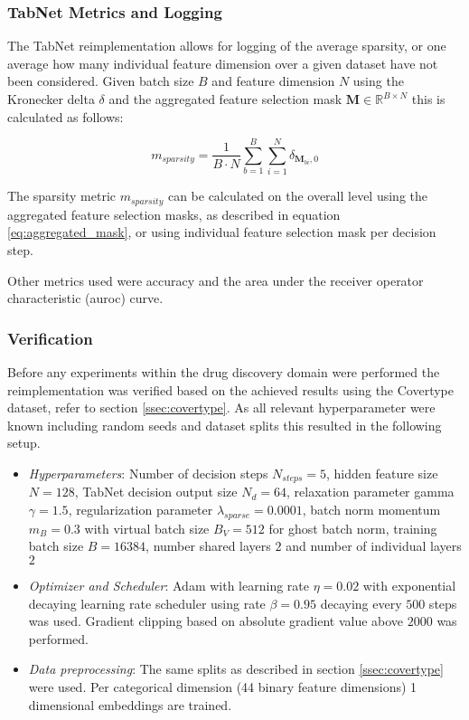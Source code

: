 \documentclass[../main.tex]{subfiles}
\begin{document}
\subsubsection{TabNet Metrics and Logging}

The TabNet reimplementation allows for logging of the average sparsity, or one average how many individual feature dimension over a given dataset have not been considered. Given batch size $B$ and feature dimension $N$ using the Kronecker delta $\delta$ and the aggregated feature selection mask $\mathbf{M} \in \mathbb{R}^{B \times N}$ this is calculated as follows:

\begin{equation} \label{eq:sparsity}
	m_{sparsity}=\frac{1}{B \cdot N}\sum_{b=1}^{B} \sum_{i=1}^{N} \delta_{\mathbf{M}_{bi}, 0}
\end{equation}

The sparsity metric $m_{sparsity}$ can be calculated on the overall level using the aggregated feature selection masks, as described in equation \ref{eq:aggregated_mask}, or using individual feature selection mask per decision step.

Other metrics used were accuracy and the area under the receiver operator characteristic (\acs{auroc}) curve. 

\subsubsection{Verification}

Before any experiments within the drug discovery domain were performed the reimplementation was verified based on the achieved results using the Covertype dataset, refer to section \ref{ssec:covertype}. As all relevant hyperparameter were known including random seeds and dataset splits this resulted in the following setup. 

\begin{itemize}
	\item \emph{Hyperparameters}: Number of decision steps $N_{steps}=5$, hidden feature size $N=128$, TabNet decision output size $N_d=64$, relaxation parameter gamma $\gamma=1.5$, regularization parameter $\lambda_{sparse}=0.0001$, batch norm momentum $m_B=0.3$ with virtual batch size $B_V=512$ for ghost batch norm, training batch size $B=16384$, number shared layers $2$ and number of individual layers $2$
	\item \emph{Optimizer and Scheduler}: Adam with learning rate $\eta=0.02$ with exponential decaying learning rate scheduler using rate $\beta=0.95$ decaying every $500$ steps was used. Gradient clipping based on absolute gradient value above $2000$ was performed.
	\item \emph{Data preprocessing}: The same splits as described in section \ref{ssec:covertype} were used. Per categorical dimension (44 binary feature dimensions) 1 dimensional embeddings are trained.	
\end{itemize}
\end{document}
